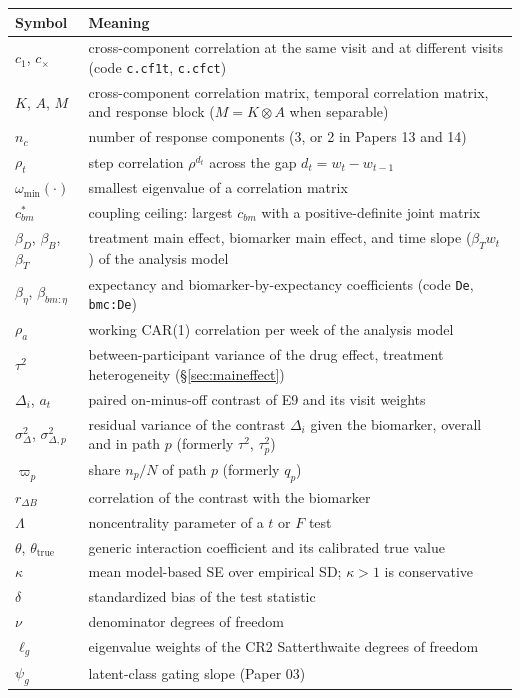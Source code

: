 \documentclass[11pt]{article}
\newcommand{\code}[1]{\texttt{#1}}
\begin{document}
\begin{center}
\begin{tabular}{@{}lp{}@{}}
\toprule
Symbol & Meaning \\
\midrule
$c_1$, $c_\times$ & cross-component correlation at the same visit and at different visits (code \code{c.cf1t}, \code{c.cfct}) \\
$K$, $A$, $M$ & cross-component correlation matrix, temporal correlation matrix, and response block ($M = K \otimes A$ when separable) \\
$n_c$ & number of response components (3, or 2 in Papers 13 and 14) \\
$\rho_t$ & step correlation $\rho^{d_t}$ across the gap $d_t = w_t - w_{t-1}$ \\
$\omega_{\min}(\cdot)$ & smallest eigenvalue of a correlation matrix \\
$c_{bm}^{\ast}$ & coupling ceiling: largest $c_{bm}$ with a positive-definite joint matrix \\
$\beta_D$, $\beta_B$, $\beta_T$ & treatment main effect, biomarker main effect, and time slope ($\beta_T w_t$) of the analysis model \\
$\beta_\eta$, $\beta_{bm:\eta}$ & expectancy and biomarker-by-expectancy coefficients (code \code{De}, \code{bmc:De}) \\
$\rho_a$ & working CAR(1) correlation per week of the analysis model \\
$\tau^2$ & between-participant variance of the drug effect, treatment heterogeneity (\S\ref{sec:maineffect}) \\
$\Delta_i$, $a_t$ & paired on-minus-off contrast of E9 and its visit weights \\
$\sigma_\Delta^2$, $\sigma_{\Delta,p}^2$ & residual variance of the contrast $\Delta_i$ given the biomarker, overall and in path $p$ (formerly $\tau^2$, $\tau_p^2$) \\
$\varpi_p$ & share $n_p/N$ of path $p$ (formerly $q_p$) \\
$r_{\Delta B}$ & correlation of the contrast with the biomarker \\
$\Lambda$ & noncentrality parameter of a $t$ or $F$ test \\
$\theta$, $\theta_{\mathrm{true}}$ & generic interaction coefficient and its calibrated true value \\
$\kappa$ & mean model-based SE over empirical SD; $\kappa > 1$ is conservative \\
$\delta$ & standardized bias of the test statistic \\
$\nu$ & denominator degrees of freedom \\
$\ell_g$ & eigenvalue weights of the CR2 Satterthwaite degrees of freedom \\
$\psi_g$ & latent-class gating slope (Paper 03) \\
\bottomrule
\end{tabular}
\end{center}
\end{document}
